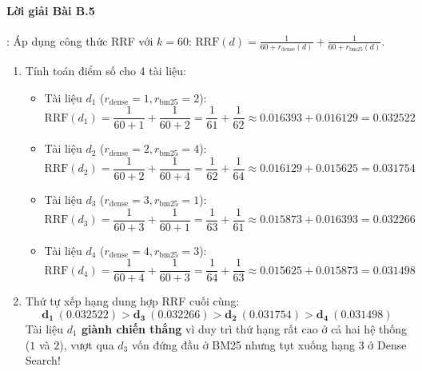 \paragraph{Lời giải Bài B.5}:
Áp dụng công thức RRF với $k = 60$: $\text{RRF}(d) = \frac{1}{60 + r_{\text{dense}}(d)} + \frac{1}{60 + r_{\text{bm25}}(d)}$.
\begin{enumerate}
  \item Tính toán điểm số cho 4 tài liệu:
  \begin{itemize}
    \item Tài liệu $d_1$ ($r_{\text{dense}} = 1, r_{\text{bm25}} = 2$):
    \begin{equation*}
    \text{RRF}(d_1) = \frac{1}{60 + 1} + \frac{1}{60 + 2} = \frac{1}{61} + \frac{1}{62} \approx 0.016393 + 0.016129 = \mathbf{0.032522}
    \end{equation*}
    \item Tài liệu $d_2$ ($r_{\text{dense}} = 2, r_{\text{bm25}} = 4$):
    \begin{equation*}
    \text{RRF}(d_2) = \frac{1}{60 + 2} + \frac{1}{60 + 4} = \frac{1}{62} + \frac{1}{64} \approx 0.016129 + 0.015625 = \mathbf{0.031754}
    \end{equation*}
    \item Tài liệu $d_3$ ($r_{\text{dense}} = 3, r_{\text{bm25}} = 1$):
    \begin{equation*}
    \text{RRF}(d_3) = \frac{1}{60 + 3} + \frac{1}{60 + 1} = \frac{1}{63} + \frac{1}{61} \approx 0.015873 + 0.016393 = \mathbf{0.032266}
    \end{equation*}
    \item Tài liệu $d_4$ ($r_{\text{dense}} = 4, r_{\text{bm25}} = 3$):
    \begin{equation*}
    \text{RRF}(d_4) = \frac{1}{60 + 4} + \frac{1}{60 + 3} = \frac{1}{64} + \frac{1}{63} \approx 0.015625 + 0.015873 = \mathbf{0.031498}
    \end{equation*}
  \end{itemize}

  \item Thứ tự xếp hạng dung hợp RRF cuối cùng:
  \begin{equation*}
  \mathbf{d_1} \ (0.032522) > \mathbf{d_3} \ (0.032266) > \mathbf{d_2} \ (0.031754) > \mathbf{d_4} \ (0.031498)
  \end{equation*}
  Tài liệu \textbf{$d_1$ giành chiến thắng} vì duy trì thứ hạng rất cao ở cả hai hệ thống ($1$ và $2$), vượt qua $d_3$ vốn đứng đầu ở BM25 nhưng tụt xuống hạng $3$ ở Dense Search!
\end{enumerate}

